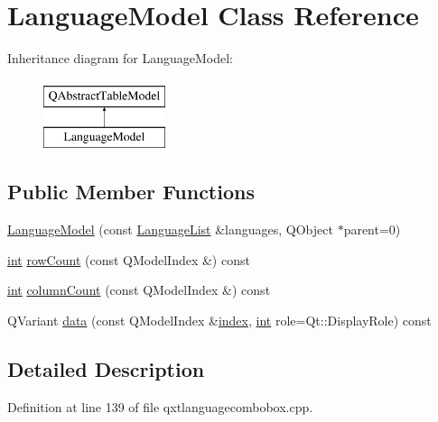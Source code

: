 \hypertarget{class_language_model}{\section{Language\-Model Class Reference}
\label{class_language_model}
}
Inheritance diagram for Language\-Model\-:\begin{figure}[H]
\begin{center}
\leavevmode
\includegraphics[height=2.000000cm]{class_language_model}
\end{center}
\end{figure}
\subsection*{Public Member Functions}
\begin{DoxyCompactItemize}
\item 
\hyperlink{class_language_model_a14c14dc525fa294e4c6952bbfaee004f}{Language\-Model} (const \hyperlink{qxtlanguagecombobox_8cpp_a3ed70ebce87136a0d0a8ed4ab014a352}{Language\-List} \&languages, Q\-Object $\ast$parent=0)
\item 
\hyperlink{ioapi_8h_a787fa3cf048117ba7123753c1e74fcd6}{int} \hyperlink{class_language_model_ad95dd91ac8a26662fc9542ff1c7b27d8}{row\-Count} (const Q\-Model\-Index \&) const 
\item 
\hyperlink{ioapi_8h_a787fa3cf048117ba7123753c1e74fcd6}{int} \hyperlink{class_language_model_ac4e99c1e28a551ae79f2cbe0750c0cf3}{column\-Count} (const Q\-Model\-Index \&) const 
\item 
Q\-Variant \hyperlink{class_language_model_a813f26ae2b114053c2dc67b0839b25ff}{data} (const Q\-Model\-Index \&\hyperlink{glext_8h_ab47dd9958bcadea08866b42bf358e95e}{index}, \hyperlink{ioapi_8h_a787fa3cf048117ba7123753c1e74fcd6}{int} role=Qt\-::\-Display\-Role) const 
\end{DoxyCompactItemize}


\subsection{Detailed Description}


Definition at line 139 of file qxtlanguagecombobox.\-cpp.



